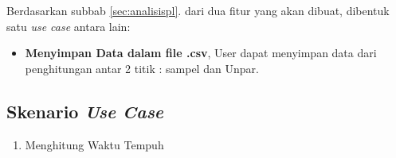 Berdasarkan subbab \ref{sec:analisispl}. dari dua fitur yang akan dibuat, dibentuk satu \textit{use case} antara lain:
\begin{itemize}
\item \textbf{Menyimpan Data dalam file .csv}, User dapat menyimpan data dari penghitungan antar 2 titik : sampel dan Unpar.
\end{itemize}

\subsection{Skenario \textit{Use Case}}
\label{subsec:skenariousecase}

\begin{enumerate}
	\item Menghitung Waktu Tempuh
	

\end{enumerate}
